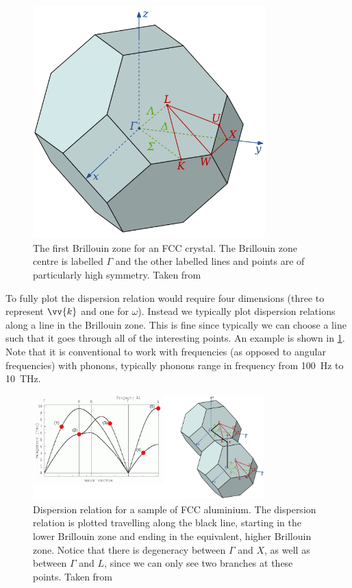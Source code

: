 \documentclass[fleqn]{NotesClass}
\begin{document}
    \begin{figure}
        \includegraphics[width=0.8\textwidth]{images/brilloin-zone-fcc.png}
        \caption[3D Brillouin zone]{The first Brillouin zone for an FCC crystal. The Brillouin zone centre is labelled \(\Gamma\) and the other labelled lines and points are of particularly high symmetry. Taken from \cite{Inductiveload2008}}
    \end{figure}

    To fully plot the dispersion relation would require four dimensions (three to represent \(\vv{k}\) and one for \(\omega\)).
    Instead we typically plot dispersion relations along a line in the Brillouin zone.
    This is fine since typically we can choose a line such that it goes through all of the interesting points.
    An example is shown in \cref{fig:dispersion relation in brillouin zone}.
    Note that it is conventional to work with frequencies (as opposed to angular frequencies) with phonons, typically phonons range in frequency from \qty{100}{\hertz} to \qty{10}{\tera\hertz}.
    
    \begin{figure}
        \includegraphics[width=0.8\textwidth]{images/dispersion-relation-brillouin-zone.png}
        \caption[Dispersion relation]{Dispersion relation for a sample of FCC aluminium. The dispersion relation is plotted travelling along the black line, starting in the lower Brillouin zone and ending in the equivalent, higher Brillouin zone. Notice that there is degeneracy between \(\Gamma\) and \(X\), as well as between \(\Gamma\) and \(L\), since we can only see two branches at these points. Taken from \cite{phonondispersionrelation}}
        \label{fig:dispersion relation in brillouin zone}
    \end{figure}
    
\end{document}
